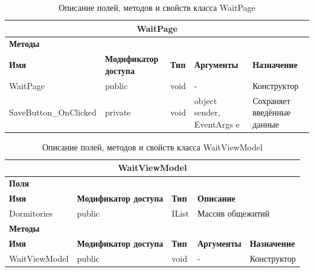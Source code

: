 \documentclass{../includes/TechDoc}
\begin{document}
    \newpage

    \begin{table}[ht]
        \caption{\label{tab:class-waitpage-table}Описание полей, методов и свойств класса WaitPage}
        \centering
        \begin{tabular}{|l|p{3cm}|l|p{3cm}|p{5cm}|}
            \hline
            \multicolumn{5}{|c|}{WaitPage} \\ \hline
            \multicolumn{5}{|l|}{\textbf{Методы}} \\ \hline
            \textbf{Имя} & \textbf{Модификатор доступа} & \textbf{Тип} & \textbf{Аргументы} & \textbf{Назначение} \\ \hline
            WaitPage & public & void & - & Конструктор \\ \hline
            SaveButton\_OnClicked & private & void & object sender, EventArgs e & Сохраняет введённые данные \\ \hline
        \end{tabular}
    \end{table}

    \newpage

    \begin{table}[ht]
        \caption{\label{tab:class-waitviewmodel-table}Описание полей, методов и свойств класса WaitViewModel}
        \centering
        \begin{tabular}{|l|p{3cm}|l|p{3cm}|p{5cm}|}
            \hline
            \multicolumn{5}{|c|}{WaitViewModel} \\ \hline
            \multicolumn{5}{|l|}{\textbf{Поля}} \\ \hline
            \textbf{Имя} & \textbf{Модификатор доступа} & \textbf{Тип} & \multicolumn{2}{l|}{\textbf{Описание}} \\ \hline
            Dormitories & public & IList & \multicolumn{2}{l|}{Массив общежитий} \\ \hline
            \multicolumn{5}{|l|}{\textbf{Методы}} \\ \hline
            \textbf{Имя} & \textbf{Модификатор доступа} & \textbf{Тип} & \textbf{Аргументы} & \textbf{Назначение} \\ \hline
            WaitViewModel & public & void & - & Конструктор \\ \hline
        \end{tabular}
    \end{table}

    \newpage
\end{document}
